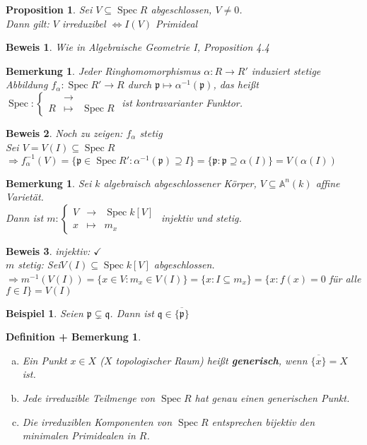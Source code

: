 \documentclass[a4paper,12pt]{report}
\theoremstyle{break}
\newtheorem{DefBem}[Def]{Definition + Bemerkung}
\newtheorem{Bem}[Def]{Bemerkung}
\newtheorem{Prop}[Def]{Proposition}
\theoremstyle{nonumberbreak}
\newtheorem{bsp}{Beispiel}
\newtheorem{bew}{Beweis}
\theoremstyle{nonumberplain}
\newcommand{\emp}[1]{\textbf{\emph{#1}}}
\newcommand{\defterm}[1]{{\index{#1}}\emp{#1}}
\DeclareMathOperator{\Spec}{Spec}
\DeclareMathOperator{\Ringe}{\underline{Ringe}}
\DeclareMathOperator{\Top}{\underline{Top}}
\newcommand{\A}{\mathbb{A}}
\newcommand{\p}{\mathfrak{p}}
\newcommand{\q}{\mathfrak{q}}
\begin{document}
\begin{Prop}
Sei $V\subseteq \Spec R$ abgeschlossen, $V\ne 0$.\\
Dann gilt: $V$ irreduzibel $\Leftrightarrow I(V)$ Primideal
\end{Prop}

\begin{bew}
Wie in Algebraische Geometrie I, Proposition 4.4
\end{bew}

\begin{Bem}
Jeder Ringhomomorphismus $\alpha: R \to R'$ induziert stetige Abbildung $f_\alpha:\Spec R' \to R$ durch $\p \mapsto \alpha^{-1}(\p)$, das hei\ss t $\Spec: \left\{\begin{array}{ccc} \Ringe &\to& \Top \\ R &\mapsto& \Spec R\end{array}\right.$ ist kontravarianter Funktor.
\end{Bem}

\begin{bew}
Noch zu zeigen: $f_\alpha$ stetig\\
Sei $V=V(I) \subseteq \Spec R$\\
$\Rightarrow f_\alpha^{-1}(V) = \{\p \in \Spec R': \alpha^{-1}(\p) \supseteq I\} = \{ \p: \p \supseteq \alpha(I)\} = V(\alpha(I))$
\end{bew}

\begin{Bem}
Sei $k$ algebraisch abgeschlossener K\"orper, $V\subseteq \A^n(k)$ affine Variet\"at.\\
Dann ist $m: \left\{ \begin{array}{ccc} V &\to& \Spec k[V]\\ x &\mapsto& m_x\end{array}\right.$ injektiv und stetig.
\end{Bem}

\begin{bew}
injektiv: $\checkmark$\\
$m$ stetig: Sei$V(I) \subseteq \Spec k[V]$ abgeschlossen.\\
$\Rightarrow m^{-1}(V(I)) = \{ x\in V: m_x \in V(I)\} = \{x: I \subseteq m_x\} = \{x: f(x) = 0$ f\"ur alle $f\in I\} = V(I)$
\end{bew}

\begin{bsp}
Seien $\p \subsetneq\q$. Dann ist $\q \in \overline{\{\p\}}$
\end{bsp}

\begin{DefBem}\begin{enumerate}[a)]
\item
	Ein Punkt $x\in X$ ($X$ topologischer Raum) hei\ss t \defterm{generisch}, wenn $\overline{\{x\}} = X$ ist.
\item
	Jede irreduzible Teilmenge von $\Spec R$ hat genau einen generischen Punkt.
\item
	Die irreduziblen Komponenten von $\Spec R$ entsprechen bijektiv den minimalen Primidealen in $R$.
\end{enumerate}\end{DefBem}
\end{document}
